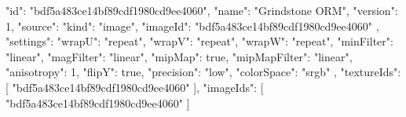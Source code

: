 {
  "id": "bdf5a483ce14bf89cdf1980cd9ee4060",
  "name": "Grindstone ORM",
  "version": 1,
  "source": {
    "kind": "image",
    "imageId": "bdf5a483ce14bf89cdf1980cd9ee4060"
  },
  "settings": {
    "wrapU": "repeat",
    "wrapV": "repeat",
    "wrapW": "repeat",
    "minFilter": "linear",
    "magFilter": "linear",
    "mipMap": true,
    "mipMapFilter": "linear",
    "anisotropy": 1,
    "flipY": true,
    "precision": "low",
    "colorSpace": "srgb"
  },
  "textureIds": [
    "bdf5a483ce14bf89cdf1980cd9ee4060"
  ],
  "imageIds": [
    "bdf5a483ce14bf89cdf1980cd9ee4060"
  ]
}
